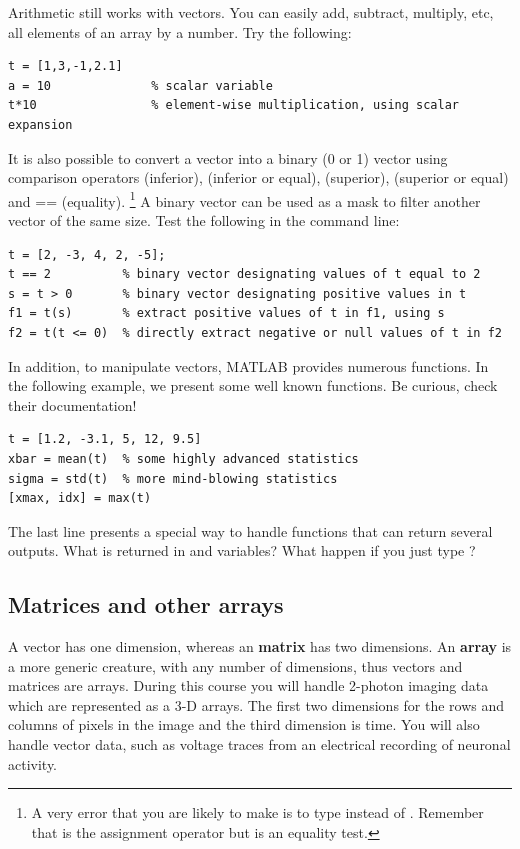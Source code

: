 \documentclass{article}
\begin{document}
Arithmetic still works with vectors.
You can easily add, subtract, multiply, etc, all elements of an array by a number.
Try the following:
\begin{lstlisting}
t = [1,3,-1,2.1]
a = 10              % scalar variable
t*10                % element-wise multiplication, using scalar expansion
\end{lstlisting}

It is also possible to convert a vector into a binary (0 or 1) vector using comparison operators \mcode{<} (inferior), \mcode{<=} (inferior or equal), \mcode{>} (superior), \mcode{>=} (superior or equal) and {==} (equality).%
\footnote{%
  A very error that you are likely to make is to type  instead of .
  Remember that \mcode{=} is the assignment operator but \mcode{==} is an equality test.
}
A binary vector can be used as a mask to filter another vector of the same size.
Test the following in the command line:
\begin{lstlisting}
t = [2, -3, 4, 2, -5];
t == 2          % binary vector designating values of t equal to 2
s = t > 0       % binary vector designating positive values in t
f1 = t(s)       % extract positive values of t in f1, using s
f2 = t(t <= 0)  % directly extract negative or null values of t in f2
\end{lstlisting}

In addition, to manipulate vectors, MATLAB provides numerous functions.
In the following example, we present some well known functions.
Be curious, check their documentation!
\begin{lstlisting}
t = [1.2, -3.1, 5, 12, 9.5]
xbar = mean(t)  % some highly advanced statistics
sigma = std(t)  % more mind-blowing statistics
[xmax, idx] = max(t)
\end{lstlisting}
The last line presents a special way to handle functions that can return several outputs.
What is returned in  and  variables?
What happen if you just type ?


\pagebreak
\subsection{Matrices and other arrays}

A vector has one dimension, whereas an \textbf{matrix} has two dimensions.
An \textbf{array} is a more generic creature, with any number of dimensions, thus vectors and matrices are arrays.
During this course you will handle 2-photon imaging data which are represented as a 3-D arrays.
The first two dimensions for the rows and columns of pixels in the image and the third dimension is time.
You will also handle vector data, such as voltage traces from an electrical recording of neuronal activity.
\end{document}
